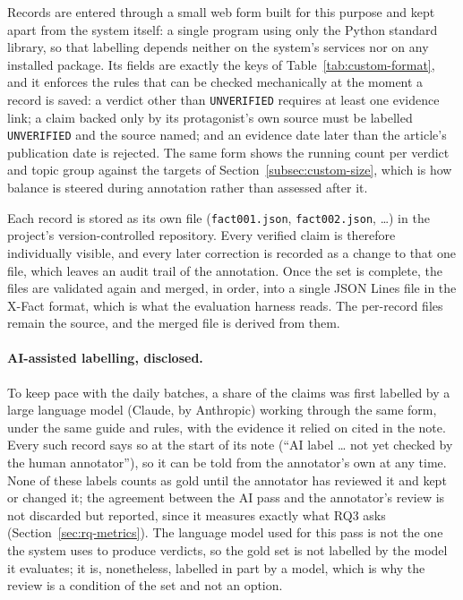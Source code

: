 Records are entered through a small web form built for this purpose
and kept apart from the system itself: a single program using only the
Python standard library, so that labelling depends neither on the
system's services nor on any installed package. Its fields are exactly
the keys of Table~\ref{tab:custom-format}, and it enforces the rules
that can be checked mechanically at the moment a record is saved:
a verdict other than \texttt{UNVERIFIED} requires at least one
evidence link; a claim backed only by its protagonist's own source
must be labelled \texttt{UNVERIFIED} and the source named; and an
evidence date later than the article's publication date is rejected.
The same form shows the running count per verdict and topic group
against the targets of Section~\ref{subsec:custom-size}, which is how
balance is steered during annotation rather than assessed after it.

Each record is stored as its own file (\texttt{fact001.json},
\texttt{fact002.json}, \ldots) in the project's version-controlled
repository. Every verified claim is therefore individually visible,
and every later correction is recorded as a change to that one file,
which leaves an audit trail of the annotation. Once the set is
complete, the files are validated again and merged, in order, into a
single JSON Lines file in the X-Fact format, which is what the
evaluation harness reads. The per-record files remain the source, and
the merged file is derived from them.

\paragraph{AI-assisted labelling, disclosed.} To keep pace with the
daily batches, a share of the claims was first labelled by a large
language model (Claude, by Anthropic) working through the same form,
under the same guide and rules, with the evidence it relied on cited
in the note. Every such record says so at the start of its note
(``AI label \ldots{} not yet checked by the human annotator''), so it
can be told from the annotator's own at any time. None of these labels
counts as gold until the annotator has reviewed it and kept or changed
it; the agreement between the AI pass and the annotator's review is
not discarded but reported, since it measures exactly what RQ3 asks
(Section~\ref{sec:rq-metrics}). The language model used for this pass
is not the one the system uses to produce verdicts, so the gold set is
not labelled by the model it evaluates; it is, nonetheless, labelled
in part by a model, which is why the review is a condition of the set
and not an option.
